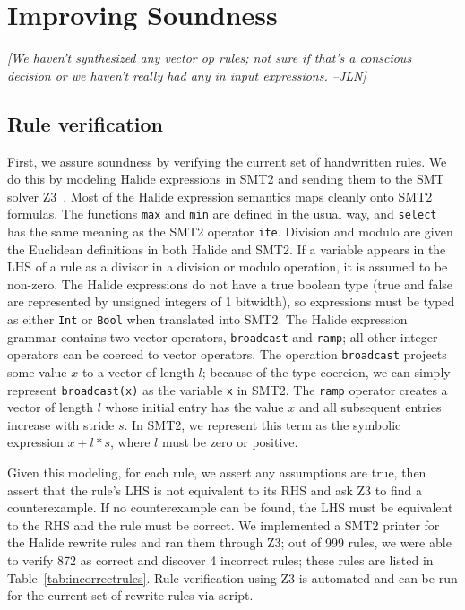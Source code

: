\documentclass[sigplan,review,anonymous]{acmart}\settopmatter{printfolios=true,printccs=false,printacmref=false}
\newcommand{\jln}[1]{\textcolor{uwpurple}{\textit{[{#1} --JLN]}}}
\begin{document}
\section{Improving Soundness}
\jln{We haven't synthesized any vector op rules; not sure if that's a conscious decision or we haven't really had any in input expressions.}


\subsection{Rule verification}

First, we assure soundness by verifying the current set of handwritten rules. We do this by modeling Halide expressions in SMT2 and sending them to the SMT solver Z3~\cite{de2008z3}. Most of the Halide expression semantics maps cleanly onto SMT2 formulas. The functions \texttt{max} and \texttt{min} are defined in the usual way, and \texttt{select} has the same meaning as the SMT2 operator \texttt{ite}. Division and modulo are given the Euclidean definitions in both Halide and SMT2. If a variable appears in the LHS of a rule as a divisor in a division or modulo operation, it is assumed to be non-zero. The Halide expressions do not have a true boolean type (true and false are represented by unsigned integers of 1 bitwidth), so expressions must be typed as either \texttt{Int} or \texttt{Bool} when translated into SMT2. The Halide expression grammar contains two vector operators, \texttt{broadcast} and \texttt{ramp}; all other integer operators can be coerced to vector operators. The operation \texttt{broadcast} projects some value $x$ to a vector of length $l$; because of the type coercion, we can simply represent \texttt{broadcast(x)} as the variable \texttt{x} in SMT2. The \texttt{ramp} operator creates a vector of length $l$ whose initial entry has the value $x$ and all subsequent entries increase with stride $s$. In SMT2, we represent this term as the symbolic expression $x + l * s$, where $l$ must be zero or positive.

Given this modeling, for each rule, we assert any assumptions are true, then assert that the rule's LHS is not equivalent to its RHS and ask Z3 to find a counterexample. If no counterexample can be found, the LHS must be equivalent to the RHS and the rule must be correct. We implemented a SMT2 printer for the Halide rewrite rules and ran them through Z3; out of 999 rules, we were able to verify 872 as correct and discover 4 incorrect rules; these rules are listed in Table~\ref{tab:incorrectrules}. Rule verification using Z3 is automated and can be run for the current set of rewrite rules via script.
\end{document}
